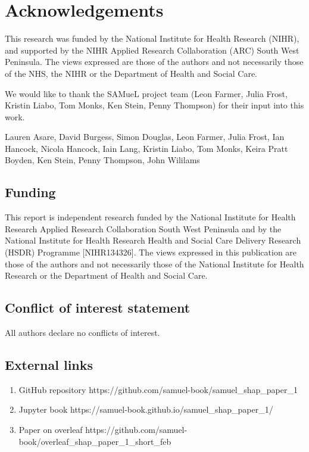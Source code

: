 \section{Acknowledgements}

This research was funded by the National Institute for Health Research (NIHR), and supported by the NIHR Applied Research Collaboration (ARC) South West Peninsula. The views expressed are those of the authors and not necessarily those of the NHS, the NIHR or the Department of Health and Social Care.

We would like to thank the SAMueL project team (Leon Farmer, Julia Frost, Kristin Liabo, Tom Monks, Ken Stein, Penny Thompson) for their input into this work.


Lauren Asare, David Burgess, Simon Douglas, Leon Farmer, Julia Frost, Ian Hancock, Nicola Hancock, Iain Lang, Kristin Liabo, Tom Monks, Keira Pratt Boyden, Ken Stein, Penny Thompson, John Wililams

\subsection*{Funding}

This report is independent research funded by the National Institute for Health Research Applied Research Collaboration South West Peninsula and by the National Institute for Health Research Health and Social Care Delivery Research (HSDR) Programme [NIHR134326]. The views expressed in this publication are those of the authors and not necessarily those of the National Institute for Health Research or the Department of Health and Social Care.

\subsection*{Conflict of interest statement}

All authors declare no conflicts of interest.

\subsection*{External links}
\begin{enumerate}
    \item GitHub repository https://github.com/samuel-book/samuel_shap_paper_1
    \item Jupyter book https://samuel-book.github.io/samuel_shap_paper_1/
    \item Paper on overleaf https://github.com/samuel-book/overleaf_shap_paper_1_short_feb
\end{enumerate}
